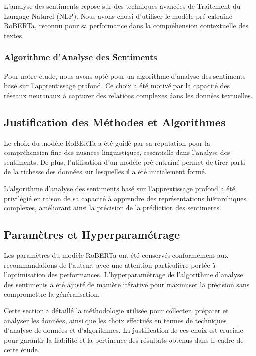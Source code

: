 L'analyse des sentiments repose sur des techniques avancées de Traitement du Langage Naturel (NLP). Nous avons choisi d'utiliser le modèle pré-entraîné RoBERTa, reconnu pour sa performance dans la compréhension contextuelle des textes.

\subsubsection{Algorithme d'Analyse des Sentiments}

Pour notre étude, nous avons opté pour un algorithme d'analyse des sentiments basé sur l'apprentissage profond. Ce choix a été motivé par la capacité des réseaux neuronaux à capturer des relations complexes dans les données textuelles.

\subsection{Justification des Méthodes et Algorithmes}

Le choix du modèle RoBERTa a été guidé par sa réputation pour la compréhension fine des nuances linguistiques, essentielle dans l'analyse des sentiments. De plus, l'utilisation d'un modèle pré-entraîné permet de tirer parti de la richesse des données sur lesquelles il a été initialement formé.

L'algorithme d'analyse des sentiments basé sur l'apprentissage profond a été privilégié en raison de sa capacité à apprendre des représentations hiérarchiques complexes, améliorant ainsi la précision de la prédiction des sentiments.

\subsection{Paramètres et Hyperparamétrage}

Les paramètres du modèle RoBERTa ont été conservés conformément aux recommandations de l'auteur, avec une attention particulière portée à l'optimisation des performances. L'hyperparamétrage de l'algorithme d'analyse des sentiments a été ajusté de manière itérative pour maximiser la précision sans compromettre la généralisation.

Cette section a détaillé la méthodologie utilisée pour collecter, préparer et analyser les données, ainsi que les choix effectués en termes de techniques d'analyse de données et d'algorithmes. La justification de ces choix est cruciale pour garantir la fiabilité et la pertinence des résultats obtenus dans le cadre de cette étude.

